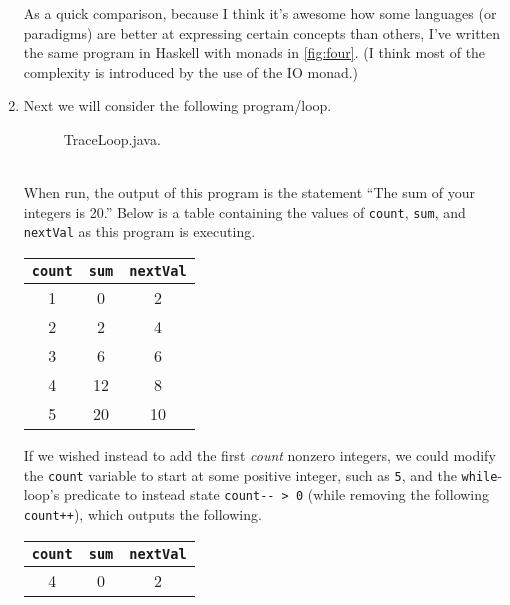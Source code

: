 \documentclass[leqno, 11pt]{article}
\begin{document}
\begin{enumerate}
        As a quick comparison, because I think it's awesome how some languages (or paradigms) are better at expressing certain concepts than others, I've written the same program in Haskell with monads in \autoref{fig:four}. (I think most of the complexity is introduced by the use of the IO monad.)
  \item Next we will consider the following program/loop.
        \begin{figure}[h!]
          \centering
          
          \caption{TraceLoop.java.}
          \label{fig:five}
        \end{figure}\\
        When run, the output of this program is the statement ``The sum of your integers is 20.'' Below is a table containing the values of \texttt{count}, \texttt{sum}, and \texttt{nextVal} as this program is executing.
        \begin{center}
          \begin{tabular}{|c|c|c|}
            \hline
            \rowcolor{tableheaderrow}
            \texttt{count} & \texttt{sum} & \texttt{nextVal}\\
            \hline
            1 & 0  & 2  \\
            \hline
            2 & 2  & 4  \\
            \hline
            3 & 6  & 6  \\
            \hline
            4 & 12 & 8  \\
            \hline
            5 & 20 & 10 \\
            \hline
          \end{tabular}
        \end{center}
        If we wished instead to add the first \textit{count} nonzero integers, we could modify the \texttt{count} variable to start at some positive integer, such as \texttt{5}, and the \texttt{while}-loop's predicate to instead state \verb|count-- > 0| (while removing the following  \texttt{count++}), which outputs the following.
        \begin{center}
          \begin{tabular}{|c|c|c|}
            \hline
            \rowcolor{tableheaderrow}
            \texttt{count} & \texttt{sum} & \texttt{nextVal}\\
            \hline
             4 & 0  & 2  \\

\end{tabular}
\end{center}
\end{enumerate}
\end{document}
